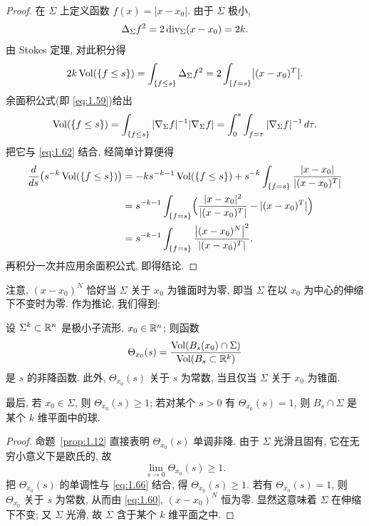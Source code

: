 \begin{proof}
在 $\Sigma$ 上定义函数 $f(x)=|x-x_0|$. 由于 $\Sigma$ 极小,
\begin{equation}
\Delta_{\Sigma}f^2=2\operatorname{div}_{\Sigma}(x-x_0)=2k.
\label{eq:1.61}
\end{equation}
由 Stokes 定理, 对此积分得
\begin{equation}
2k\operatorname{Vol}(\{f\leq s\})=\int_{\{f\leq s\}}\Delta_{\Sigma}f^2
 =2\int_{\{f=s\}}\bigl|(x-x_0)^{T}\bigr|.
\label{eq:1.62}
\end{equation}
余面积公式(即 \eqref{eq:1.59})给出
\begin{equation}
\operatorname{Vol}(\{f\leq s\})
 =\int_{\{f\leq s\}}|\nabla_{\Sigma}f|^{-1}|\nabla_{\Sigma}f|
 =\int_0^s\int_{f=\tau}|\nabla_{\Sigma}f|^{-1}\,d\tau.
\label{eq:1.63}
\end{equation}
把它与 \eqref{eq:1.62} 结合, 经简单计算便得
\begin{equation}
\begin{aligned}
\frac{d}{ds}\bigl(s^{-k}\operatorname{Vol}(\{f\leq s\})\bigr)
&=-ks^{-k-1}\operatorname{Vol}(\{f\leq s\})
 +s^{-k}\int_{\{f=s\}}\frac{|x-x_0|}{|(x-x_0)^{T}|}\\
&=s^{-k-1}\int_{\{f=s\}}
 \Bigl(\frac{|x-x_0|^2}{|(x-x_0)^{T}|}-|(x-x_0)^{T}|\Bigr)\\
&=s^{-k-1}\int_{\{f=s\}}
 \frac{\bigl|(x-x_0)^{N}\bigr|^2}{|(x-x_0)^{T}|}.
\end{aligned}
\label{eq:1.64}
\end{equation}
再积分一次并应用余面积公式, 即得结论.
\end{proof}

注意, $(x-x_0)^{N}$ 恰好当 $\Sigma$ 关于 $x_0$ 为锥面时为零, 即当 $\Sigma$
在以 $x_0$ 为中心的伸缩下不变时为零. 作为推论, 我们得到:

\begin{corollary}
\label{cor:1.13}
设 $\Sigma^k\subset\mathbb{R}^n$ 是极小子流形, $x_0\in\mathbb{R}^n$; 则函数
\begin{equation}
\Theta_{x_0}(s)
 =\frac{\operatorname{Vol}(B_s(x_0)\cap\Sigma)}{\operatorname{Vol}(B_s\subset\mathbb{R}^k)}
\label{eq:1.65}
\end{equation}
是 $s$ 的非降函数. 此外, $\Theta_{x_0}(s)$ 关于 $s$ 为常数, 当且仅当
$\Sigma$ 关于 $x_0$ 为锥面.

最后, 若 $x_0\in\Sigma$, 则 $\Theta_{x_0}(s)\geq1$; 若对某个 $s>0$ 有
$\Theta_{x_0}(s)=1$, 则 $B_s\cap\Sigma$ 是某个 $k$ 维平面中的球.
\end{corollary}

\begin{proof}
命题~\ref{prop:1.12} 直接表明 $\Theta_{x_0}(s)$ 单调非降. 由于 $\Sigma$
光滑且固有, 它在无穷小意义下是欧氏的, 故
\begin{equation}
\lim_{s\to0}\Theta_{x_0}(s)\geq1.
\label{eq:1.66}
\end{equation}
把 $\Theta_{x_0}(s)$ 的单调性与 \eqref{eq:1.66} 结合, 得 $\Theta_{x_0}(s)\geq1$.
若有 $\Theta_{x_0}(s)=1$, 则 $\Theta_{x_0}$ 关于 $s$ 为常数, 从而由
\eqref{eq:1.60}, $(x-x_0)^{N}$ 恒为零. 显然这意味着 $\Sigma$ 在伸缩下不变; 又
$\Sigma$ 光滑, 故 $\Sigma$ 含于某个 $k$ 维平面之中.
\end{proof}

